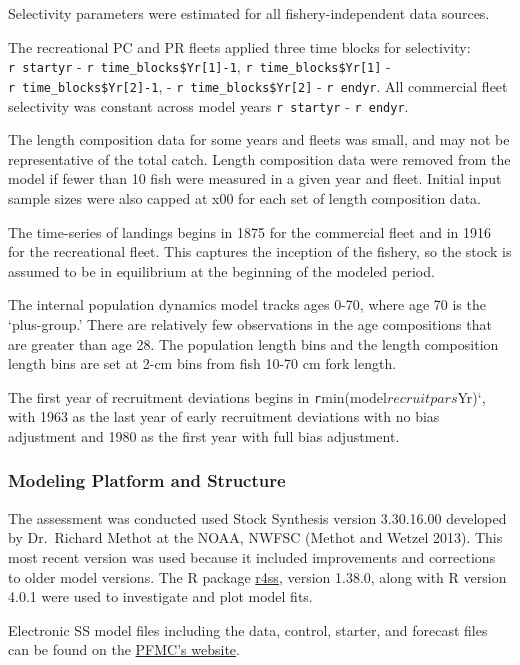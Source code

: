 \documentclass[
  english,
  a4paper,
]{article}
\begin{document}
Selectivity parameters were estimated for all fishery-independent data sources.

The recreational PC and PR fleets applied three time blocks for selectivity: \texttt{r\ startyr} - \texttt{r\ time\_blocks\$Yr{[}1{]}-1}, \texttt{r\ time\_blocks\$Yr{[}1{]}} - \texttt{r\ time\_blocks\$Yr{[}2{]}-1}, - \texttt{r\ time\_blocks\$Yr{[}2{]}} - \texttt{r\ endyr}. All commercial fleet selectivity was constant across model years \texttt{r\ startyr} - \texttt{r\ endyr}.

The length composition data for some years and fleets was small, and may not be
representative of the total catch. Length composition data were removed from the
model if fewer than 10 fish were measured in a given
year and fleet. Initial input sample sizes were also capped at x00 for each set of length composition data.

The time-series of landings begins in 1875 for the commercial fleet and in 1916 for
the recreational fleet. This captures the inception of the fishery, so the stock is
assumed to be in equilibrium at the beginning of the modeled period.

The internal population dynamics model tracks ages 0-70, where age 70 is the `plus-group.'
There are relatively few observations in the age compositions that are greater than age 28.
The population length bins and the length composition length bins are set at 2-cm bins from
fish 10-70 cm fork length.

The first year of recruitment deviations begins in \texttt{r}min(model\(recruitpars\)Yr)`, with 1963 as the last year
of early recruitment deviations with no bias adjustment and 1980 as the first year
with full bias adjustment.

\hypertarget{modeling-platform-and-structure}{%
\subsubsection{Modeling Platform and Structure}\label{modeling-platform-and-structure}}

The assessment was conducted used Stock Synthesis version 3.30.16.00 developed by
Dr.~Richard Methot at the NOAA, NWFSC (Methot and Wetzel 2013). This most recent
version was used because it included improvements and corrections to older
model versions. The R package \href{https://github.com/r4ss/r4ss}{r4ss}, version
1.38.0, along with R version 4.0.1 were used to investigate and plot model fits.

Electronic SS model files including the data, control, starter, and forecast files can be
found on the
\href{https://www.pcouncil.org/groundfish/stock-assessments/}{PFMC's website}.
\end{document}
